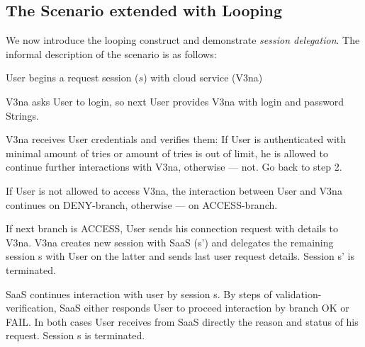 \documentclass{llncs}
\begin{document}
\subsection{The Scenario extended with Looping}
We now introduce the looping construct and demonstrate \textit{session delegation}.
The informal description of the scenario is as follows:
\begin{compactenum}
\item  User begins a request session ($s$) with cloud service (V3na)

\item  V3na asks User to login, so next User provides V3na with login and password Strings.

\item  V3na receives User credentials and verifies them: If User is authenticated with minimal amount of tries or amount of tries is out of limit, he is allowed to continue further interactions with V3na, otherwise --- not. Go back to step 2.

\item  If User is not allowed to access V3na, the interaction between User and V3na continues on DENY-branch, otherwise --- on ACCESS-branch.

\item  If next branch is ACCESS, User sends his connection request with details to V3na. V3na creates new session with SaaS (s') and delegates the remaining session s with User on the latter and sends last user request details. Session s' is terminated.

\item  SaaS continues interaction with user by session s. By steps of validation-verification, SaaS either responds User to proceed interaction by branch OK or FAIL. In both cases User receives from SaaS directly the reason and status of his request. Session s is terminated.
\end{compactenum}
\end{document}

